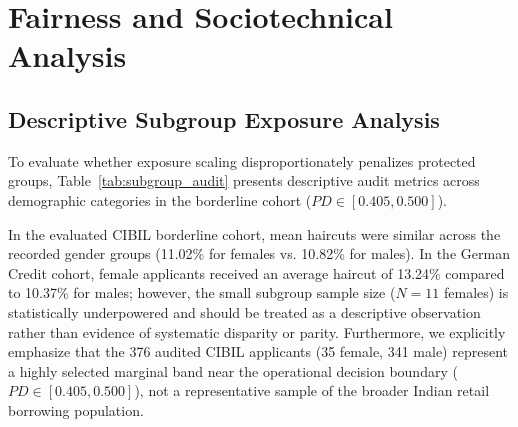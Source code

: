 \documentclass[manuscript,screen,review,anonymous]{acmart}
\begin{document}
\section{Fairness and Sociotechnical Analysis}

\subsection{Descriptive Subgroup Exposure Analysis}
To evaluate whether exposure scaling disproportionately penalizes protected groups, Table~\ref{tab:subgroup_audit} presents descriptive audit metrics across demographic categories in the borderline cohort ($PD \in [0.405, 0.500]$).

\begin{table}[!htbp]
\centering
\caption{Descriptive Subgroup Exposure-Scaling Audit Across Borderline Cohorts.}
\label{tab:subgroup_audit}
\small
\setlength{\tabcolsep}{3.5pt}
\end{table}

In the evaluated CIBIL borderline cohort, mean haircuts were similar across the recorded gender groups (11.02\% for females vs. 10.82\% for males). In the German Credit cohort, female applicants received an average haircut of 13.24\% compared to 10.37\% for males; however, the small subgroup sample size ($N=11$ females) is statistically underpowered and should be treated as a descriptive observation rather than evidence of systematic disparity or parity. Furthermore, we explicitly emphasize that the 376 audited CIBIL applicants (35 female, 341 male) represent a highly selected marginal band near the operational decision boundary ($PD \in [0.405, 0.500]$), not a representative sample of the broader Indian retail borrowing population.
\end{document}
